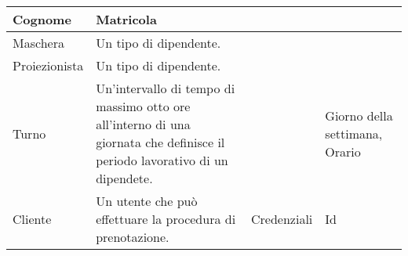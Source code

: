\begin{longtable}{|p{2.5cm}|p{7.1cm}|p{2.5cm}|p{3.2cm}|}
    Cognome
     & Matricola
    \\\hline
    Maschera
     & Un tipo di dipendente.
     &
     &
    \\\hline
    Proiezionista
     & Un tipo di dipendente.
     &
     &
    \\\hline
    Turno
     & Un’intervallo di tempo di massimo otto ore all’interno di una giornata
    che definisce il periodo lavorativo di un dipendete.
     &
     & Giorno della settimana, Orario
    \\\hline
    Cliente
     & Un utente che può effettuare la procedura di prenotazione.
     & Credenziali
     & Id
    \\\hline
\end{longtable}

